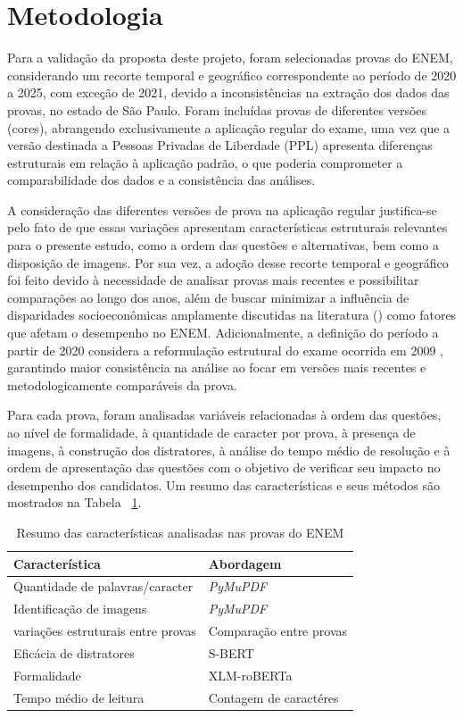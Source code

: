 \documentclass[a4paper,10pt, twocolumn]{article}
\begin{document}
\section{Metodologia}

Para a validação da proposta deste projeto, foram selecionadas provas do ENEM, considerando um recorte temporal e geográfico correspondente ao período de 2020 a 2025, com exceção de 2021, devido a inconsistências na extração dos dados das provas, no estado de São Paulo. Foram incluídas provas de diferentes versões (cores), abrangendo exclusivamente a aplicação regular do exame, uma vez que a versão destinada a Pessoas Privadas de Liberdade (PPL) apresenta diferenças estruturais em relação à aplicação padrão, o que poderia comprometer a comparabilidade dos dados e a consistência das análises.

A consideração das diferentes versões de prova na aplicação regular justifica-se pelo fato de que essas variações apresentam características estruturais relevantes para o presente estudo, como a ordem das questões e alternativas, bem como a disposição de imagens. Por sua vez, a adoção desse recorte temporal e geográfico foi feito devido à necessidade de analisar provas mais recentes e possibilitar comparações ao longo dos anos, além de buscar minimizar a influência de disparidades socioeconômicas amplamente discutidas na literatura (\textcite{Dutra2023}) como fatores que afetam o desempenho no ENEM. Adicionalmente, a definição do período a partir de 2020 considera a reformulação estrutural do exame ocorrida em 2009 \cite{Inep_2020}, garantindo maior consistência na análise ao focar em versões mais recentes e metodologicamente comparáveis da prova.

Para cada prova, foram analisadas variáveis relacionadas à ordem das questões, ao nível de formalidade, à quantidade de caracter por prova, à presença de imagens, à construção dos distratores, à análise do tempo médio de resolução e à ordem de apresentação das questões com o objetivo de verificar seu impacto no desempenho dos candidatos. Um resumo das características e seus métodos são mostrados na Tabela ~\ref{tab:tabela}.

\begin{table}[htb]
\centering
\footnotesize

\begin{tabular}{ll}
\hline
\textbf{Característica} & \textbf{Abordagem} \\
\hline
Quantidade de palavras/caracter & \textit{PyMuPDF}\\
Identificação de imagens & \textit{PyMuPDF} \\
variações estruturais entre provas & Comparação entre provas \\
Eficácia de distratores & S-BERT \\
Formalidade & XLM-roBERTa \\
Tempo médio de leitura & Contagem de caractéres\\
\hline
\end{tabular}
\caption{Resumo das características analisadas nas provas do ENEM}
\label{tab:tabela}
\end{table}
\end{document}

